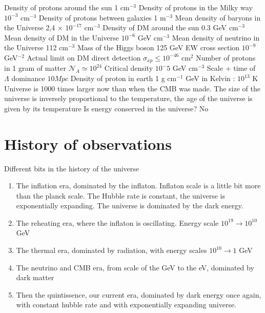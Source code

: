 \documentclass[a4paper]{book}
\theoremstyle{definition}
\theoremstyle{remark}
\begin{document}
Density of protons around the sun 1 cm$^{-3}$ \newline 
Density of protons in the Milky way $10^{-3}$ cm$^{-3}$ \newline 
Density of protons between galaxies 1 m$^{-3}$ \newline 
Mean density of baryons in the Universe 2,4 $\times$ $10^{-17}$ cm$^{-3}$ \newline 
Density of DM around the sun $0.3$ GeV cm$^{-3}$ \newline 
Mean density of DM in the Universe $10^{-6}$ GeV cm$^{-3}$ \newline 
Mean density of neutrino in the Universe 112 cm$^{-3}$ \newline 
Mass of the Higgs boson 125 GeV \newline 
EW cross section $10^{-9}$ GeV$^{-2}$ \newline 
Actual limit on DM direct detection \newline 
$\sigma_{xp} \leq 10^{-46}$ cm$^{2}$ \newline 
Number of protons in 1 gram of matter $\mathcal N_A \simeq 10^24$ \newline 
Critical density $10^-5$ GeV cm$^{-3}$ \newline 
Scale + time of $\Lambda$ dominance $10Mpc$ \newline 
Density of proton in earth 1 g cm$^{-1}$  GeV in Kelvin : $10^13$ K\newline 
Universe is 1000 times larger now than when the CMB was made. The size of the universe is inversely proportional to the temperature, the age of the universe is given by its temperature \newline 
Is energy conserved in the universe? No \par \medskip 

\section{History of observations}
Different bits in the history of the universe 
\begin{enumerate}
    \item The inflation era, dominated by the inflaton. Inflaton scale is a little bit more than the planck scale. The Hubble rate is constant, the universe is exponentially expanding. The universe is dominated by the dark energy.  
    \item The reheating era, where the inflaton is oscillating. Energy scale $10^19 \rightarrow 10^10$ GeV 
    \item The thermal era, dominated by radiation, with energy scales $10^10\rightarrow 1$ GeV 
    \item The neutrino and CMB era, from scale of the GeV to the eV, dominated by dark matter 
    \item Then the quintissence, our current era, dominated by dark energy once again, with constant hubble rate and with exponentially expanding universe. 
\end{enumerate}
\end{document}

